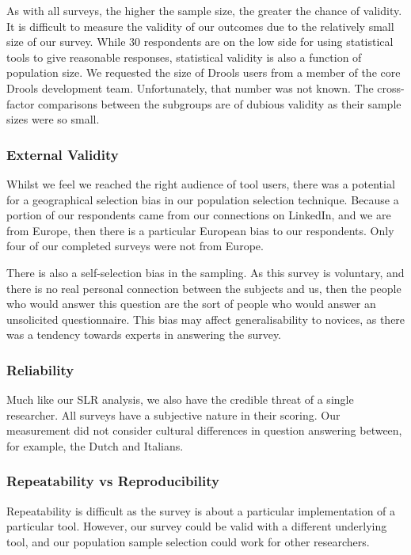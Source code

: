 As with all surveys, the higher the sample size, the greater the chance of validity.
It is difficult to measure the validity of our outcomes due to the relatively small size of our survey.
While 30 respondents are on the low side for using statistical tools to give reasonable responses, statistical validity is also a function of population size.
We requested the size of Drools users from a member of the core Drools development team.  
Unfortunately, that number was not known.
The cross-factor comparisons between the subgroups are of dubious validity as their sample sizes were so small.

\subsubsection{External Validity}
Whilst we feel we reached the right audience of tool users, there was a potential for a geographical selection bias in our population selection technique.
Because a portion of our respondents came from our connections on LinkedIn, and we are from Europe, then there is a particular European bias to our respondents.
Only four of our completed surveys were not from Europe.

There is also a self-selection bias in the sampling. 
As this survey is voluntary, and there is no real personal connection between the subjects and us, then the people who would answer this question are the sort of people who would answer an unsolicited questionnaire.
This bias may affect generalisability to novices, as there was a tendency towards experts in answering the survey.

\subsubsection{Reliability}
Much like our SLR analysis, we also have the credible threat of a single researcher.
All surveys have a subjective nature in their scoring.
Our measurement did not consider cultural differences in question answering between, for example, the Dutch and Italians.

\subsubsection{Repeatability vs Reproducibility}
Repeatability is difficult as the survey is about a particular implementation of a particular tool.
However, our survey could be valid with a different underlying tool, and our population sample selection could work for other researchers.

